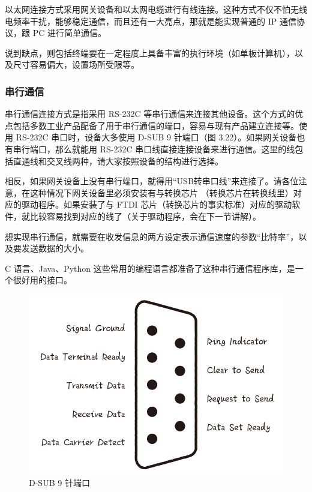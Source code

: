 \documentclass[12pt,UTF8]{ctexbook}
\begin{document}
以太网连接方式采用网关设备和以太网电缆进行有线连接。这种方式不仅不怕无线电频率干扰，能够稳定通信，而且还有一大亮点，那就是能实现普通的 IP 通信协议，跟 PC 进行简单通信。

说到缺点，则包括终端要在一定程度上具备丰富的执行环境（如单板计算机），以及尺寸容易偏大，设置场所受限等。

\subsubsection{串行通信}

串行通信连接方式是指采用 RS-232C 等串行通信来连接其他设备。这个方式的优点包括多数工业产品配备了用于串行通信的端口，容易与现有产品建立连接等。使用 RS-232C 串口时，设备大多使用 D-SUB 9 针端口（图 3.22）。如果网关设备也有串行端口，那么就能用 RS-232C 串口线直接连接设备来进行通信。这里的线包括直通线和交叉线两种，请大家按照设备的结构进行选择。

相反，如果网关设备上没有串行端口，就得用“USB转串口线”来连接了。请各位注意，在这种情况下网关设备里必须安装有与转换芯片
（转换芯片在转换线里）对应的驱动程序。如果安装了与 FTDI 芯片（转换芯片的事实标准）对应的驱动软件，就比较容易找到对应的线了（关于驱动程序，会在下一节讲解）。

想实现串行通信，就需要在收发信息的两方设定表示通信速度的参数“比特率”，以及要发送数据的大小。

C 语言、Java、Python 这些常用的编程语言都准备了这种串行通信程序库，是一个很好用的接口。

\begin{figure}[htbp]
	\centering
	\includegraphics[width=1\linewidth]{73}
	\caption{D-SUB 9 针端口}
	\label{fig:1}
\end{figure}
\end{document}
